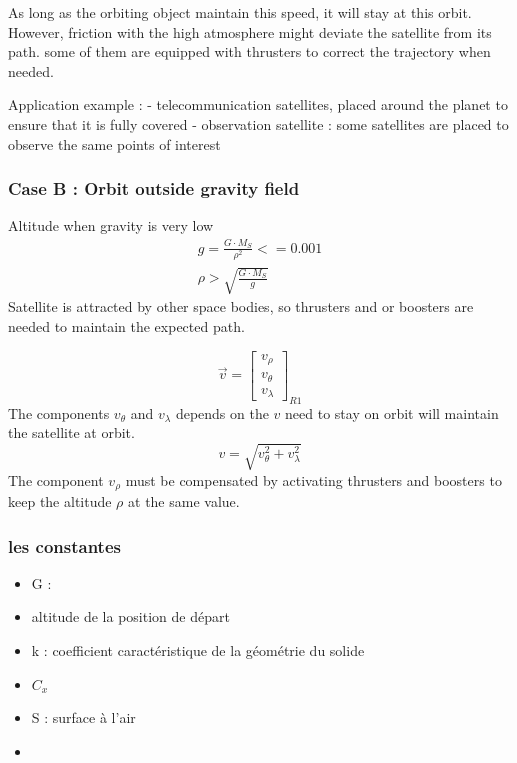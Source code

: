 \documentclass[12pt,a4paper]{article}
\begin{document}
As long as the orbiting object maintain this speed, it will stay at this orbit. However, friction with the high atmosphere might deviate the satellite from its path. some of them are equipped with thrusters to correct the trajectory when needed. 

Application example : 
- telecommunication satellites, placed around the planet to ensure that it is fully covered
- observation satellite : some satellites are placed to observe the same points of interest

\subsubsection{Case B : Orbit outside gravity field}
Altitude when gravity is very low
\begin{eqnarray}
	g = \frac{G \cdot M_S}{\rho ^2} <= 0.001\\
	\rho > \sqrt{\frac{G \cdot M_S}{g}}
\end{eqnarray}
Satellite is attracted by other space bodies, so thrusters and or boosters are needed to maintain the expected path. 

\begin{equation}
	\vec{v} = 	\begin{bmatrix}
		v_{\rho} \\
		v_{\theta}\\
		v_{\lambda}
	\end{bmatrix}_{R1}
\end{equation}
The components $v_{\theta}$ and $v_{\lambda}$ depends on the $v$ need to stay on orbit will maintain the satellite at orbit.
\begin{equation}
	v = \sqrt{v_{\theta}^2 + v_{\lambda}^2}
\end{equation}
The component $v_{\rho}$ must be compensated by activating thrusters and boosters to keep the altitude $\rho$ at the same value.


\subsubsection{les constantes}

\begin{itemize}
	\item G : 
	\item altitude de la position de départ
	\item k : coefficient caractéristique de la géométrie du solide
	\item $C_x$
	\item S : surface à l'air
	\item 
\end{itemize}
\end{document}
